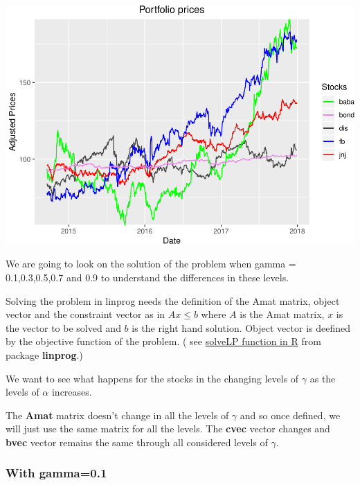 \documentclass[]{article}
\begin{document}
\includegraphics{Integrated_Management_Formulation_Model_files/figure-latex/unnamed-chunk-3-1.pdf}

We are going to look on the solution of the problem when gamma =
0.1,0.3,0.5,0.7 and 0.9 to understand the differences in these levels.

Solving the problem in linprog needs the definition of the Amat matrix,
object vector and the constraint vector as in \(Ax \leq b\) where \(A\)
is the Amat matrix, \(x\) is the vector to be solved and \(b\) is the
right hand solution. Object vector is deefined by the objective function
of the problem. ( see
\href{https://www.rdocumentation.org/packages/linprog/versions/0.9-2/topics/solveLP}{solveLP
function in R} from package \textbf{linprog}.)

We want to see what happens for the stocks in the changing levels of
\(\gamma\) as the levels of \(\alpha\) increases.

The \textbf{Amat} matrix doesn't change in all the levels of \(\gamma\)
and so once defined, we will just use the same matrix for all the
levels. The \textbf{cvec} vector changes and \textbf{bvec} vector
remains the same through all considered levels of \(\gamma\).

\subsubsection{With gamma=0.1}\label{with-gamma0.1}
\end{document}

